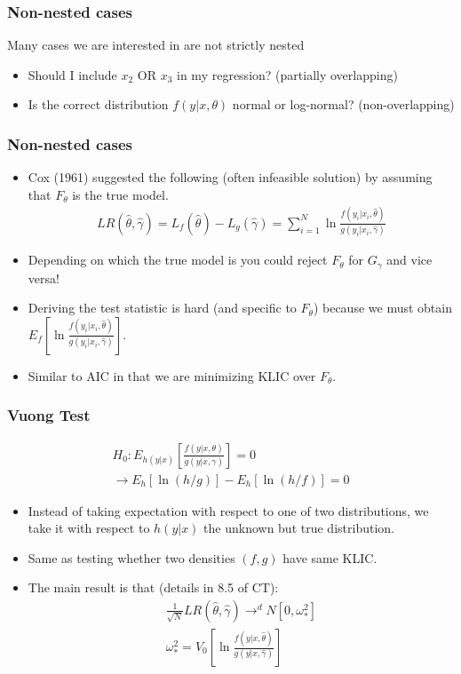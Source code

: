 \documentclass[xcolor=pdftex,dvipsnames,table,mathserif,aspectratio=169]{beamer}
\begin{document}
\begin{frame}
\frametitle{Non-nested cases}
Many cases we are interested in are \alert{not strictly nested}
\begin{itemize}
\item Should I include $x_2$ OR $x_3$ in my regression? (partially overlapping)
\item Is the correct distribution $f(y | x, \theta)$ normal or log-normal? (non-overlapping)
\end{itemize}
\end{frame}

\begin{frame}
\frametitle{Non-nested cases}
\begin{itemize}
\item Cox (1961) suggested the following (often infeasible solution) by assuming that $F_{\theta}$ is the true model.
\begin{eqnarray*}
LR(\hat{\theta},\hat{\gamma}) = L_f(\hat{\theta}) - L_g (\hat{\gamma}) = \sum_{i=1}^N \ln \frac{f(y_i | x_i, \hat{\theta})}{g(y_i | x_i, \hat{\gamma})}
\end{eqnarray*}
\item Depending on which the true model is you could reject $F_{\theta}$ for $G_{\gamma}$ and vice versa!
\item Deriving the test statistic is hard (and specific to $F_{\theta}$) because we must obtain $E_f [\ln \frac{f(y_i | x_i, \hat{\theta})}{g(y_i | x_i, \hat{\gamma})}]$.
\item Similar to AIC in that we are minimizing KLIC over $F_{\theta}$.
\end{itemize}
\end{frame}

\begin{frame}
\frametitle{Vuong Test}
\begin{eqnarray*}
H_0: E_{h(y|x)} \left[ \frac{ f(y | x,\theta) }{g(y | x, \gamma)} \right] = 0  \\
\rightarrow E_h[\ln(h/g)] - E_h[\ln (h/f)] = 0
\end{eqnarray*}
\begin{itemize}
\item Instead of taking expectation with respect to one of two distributions, we take it with respect to $h(y |x)$ the unknown but \alert{true distribution}.
\item Same as testing whether two densities $(f,g)$ have same KLIC.
\item The main result is that (details in 8.5 of CT):
\begin{eqnarray*}
\frac{1}{\sqrt{N}} LR(\hat{\theta},\hat{\gamma}) \rightarrow^d N [0,\omega_{*}^2]\\
\omega_{*}^2 =  V_0 \left[ \ln \frac{f(y| x, \hat{\theta})}{g(y| x, \hat{\gamma})}  \right]
\end{eqnarray*}
\end{itemize}
\end{frame}
\end{document}
